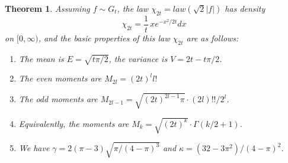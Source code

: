 \documentclass[12pt]{amsbook}
\newtheorem{theorem}{Theorem}[chapter]
\begin{document}
\begin{theorem}
Assuming $f\sim G_t$, the law $\chi_{2t}=law(\sqrt{2}|f|)$ has density
$$\chi_{2t}=\frac{1}{t}\,xe^{-x^2/2t}dx$$
on $[0,\infty)$, and the basic properties of this law $\chi_{2t}$ are as follows:
\begin{enumerate}
\item The mean is $E=\sqrt{t\pi/2}$, the variance is $V=2t-t\pi/2$.

\item The even moments are $M_{2l}=(2t)^ll!$

\item The odd moments are $M_{2l-1}=\sqrt{(2t)^{2l-1}\pi}\cdot(2l)!!/2^l$.

\item Equivalently, the moments are $M_k=\sqrt{(2t)^k}\cdot\Gamma(k/2+1)$.

\item We have $\gamma=2(\pi-3)\sqrt{\pi/(4-\pi)^3}$ and $\kappa=(32-3\pi^2)/(4-\pi)^2$.
\end{enumerate}
\end{theorem}
\end{document}
